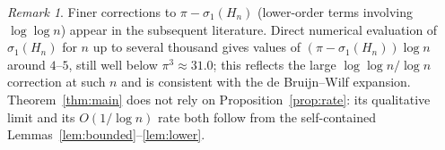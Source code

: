 \documentclass[12pt]{article}
\theoremstyle{remark}
\newtheorem*{remark}{Remark}
\begin{document}
\begin{remark}
Finer corrections to $\pi-\sigma_1(H_n)$ (lower-order terms involving $\log\log n$) appear in the
subsequent literature. Direct numerical evaluation of $\sigma_1(H_n)$ for $n$ up to several
thousand gives values of $(\pi-\sigma_1(H_n))\log n$ around $4$--$5$, still well below
$\pi^3\approx31.0$; this reflects the large $\log\log n/\log n$ correction at such $n$ and is
consistent with the de Bruijn--Wilf expansion. Theorem~\ref{thm:main} does not rely on
Proposition~\ref{prop:rate}: its qualitative limit and its $O(1/\log n)$ rate both follow from the
self-contained Lemmas~\ref{lem:bounded}--\ref{lem:lower}.
\end{remark}
\end{document}
